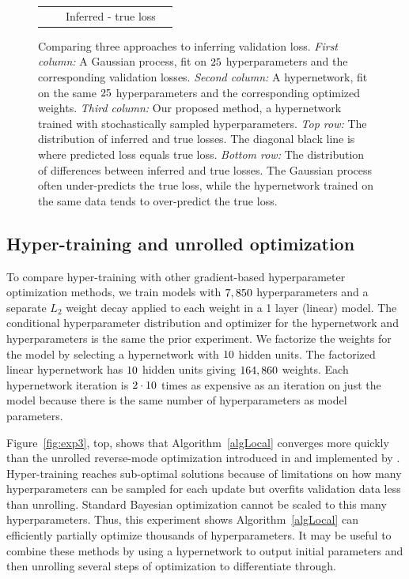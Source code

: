 \documentclass{article} %
\begin{document}
\begin{figure}[t!]
\begin{tabular}{@{\hskip3pt}c @{\hskip3pt}c @{\hskip3pt}c @{\hskip3pt}c}
	&&Inferred - true loss&\\
	\end{tabular}
	\caption{
	Comparing three approaches to inferring validation loss.
	\emph{First column:}
	{\color{red}A Gaussian process}, fit on $25$ hyperparameters and the corresponding validation losses.
	\emph{Second column:}
	{\color{green}A hypernetwork, fit on the same $25$ hyperparameters} and the corresponding optimized weights.
	\emph{Third column:}
	Our proposed method, {\color{blue}a hypernetwork trained with stochastically sampled hyperparameters}.
	\emph{Top row:}
	The distribution of inferred and true losses.
	The diagonal black line is where predicted loss equals true loss.
	\emph{Bottom row:}
	The distribution of differences between inferred and true losses.
	The Gaussian process often under-predicts the true loss, while the hypernetwork trained on the same data tends to over-predict the true loss.
	\label{fig:exp5}
	}
\end{figure}

\subsection{Hyper-training and unrolled optimization}
To compare hyper-training with other gradient-based hyperparameter optimization methods, we train models with $7,850$ hyperparameters and a separate $L_{2}$ weight decay applied to each weight in a 1 layer (linear) model.
The conditional hyperparameter distribution and optimizer for the hypernetwork and hyperparameters is the same the prior experiment.
We factorize the weights for the model by selecting a hypernetwork with $10$ hidden units.
The factorized linear hypernetwork has $10$ hidden units giving $164,860$ weights.
Each hypernetwork iteration is $2 \cdot 10$ times as expensive as an iteration on just the model because there is the same number of hyperparameters as model parameters.

Figure~\ref{fig:exp3}, top, shows that Algorithm~\ref{algLocal} converges more quickly than the unrolled reverse-mode optimization introduced in \citet{maclaurin2015gradient} and implemented by \citet{franceschi2017forward}.
Hyper-training reaches sub-optimal solutions because of limitations on how many hyperparameters can be sampled for each update but overfits validation data less than unrolling.
Standard Bayesian optimization cannot be scaled to this many hyperparameters.
Thus, this experiment shows Algorithm~\ref{algLocal} can efficiently partially optimize thousands of hyperparameters.
It may be useful to combine these methods by using a hypernetwork to output initial parameters and then unrolling several steps of optimization to differentiate through.
\end{document}
